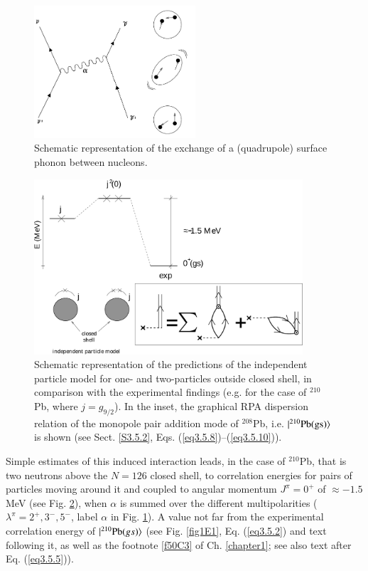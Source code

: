 \begin{figure}
\centerline {
\includegraphics*[width=6cm]{introduccion/figs/figintroD9}
}
\caption{Schematic representation of the exchange of a (quadrupole) surface phonon between nucleons.}
\label{fig:4.9}
\end{figure}
\begin{figure}
\centerline {
\includegraphics*[width=10cm]{introduccion/figs/figintroD10}
}
\caption[Schematic representation of the predictions of the independent particle model for one- and two-particles outside closed shell, in comparison with the experimental findings.]{Schematic representation of the predictions of the independent particle model for one- and two-particles outside closed shell, in comparison with the experimental findings (e.g. for the case of $^{210}$Pb, where $j=g_{9/2}$). In the inset, the graphical RPA dispersion relation of the monopole pair addition mode of $^{208}$Pb, i.e. $|{^{210}\text{Pb(gs)}} \rangle$ is shown (see Sect. \ref{S3.5.2}, Eqs. (\ref{eq3.5.8})--(\ref{eq3.5.10})).}
\label{fig:4.10}
\end{figure}
Simple estimates of this induced interaction leads, in the case of $^{210}$Pb, that is two neutrons above the $N=126$ closed shell, to correlation energies  for pairs of particles moving around it and coupled to angular momentum $J^{\pi} = 0^+$ of $\approx -1.5$ MeV (see Fig. \ref{fig:4.10}), when $\alpha$ is summed over  the different multipolarities  ($\lambda^{\pi}=2^+,3^-,5^-$, label $\alpha$ in Fig. \ref{fig:4.9}). A value not far from the experimental correlation energy of $|{^{210}\text{Pb}(gs)} \rangle$ (see Fig. \ref{fig1E1}, Eq. (\ref{eq3.5.2}) and text following it, as well as the footnote \ref{f50C3} of Ch. \ref{chapter1}; see also text after Eq. (\ref{eq3.5.5})). 


